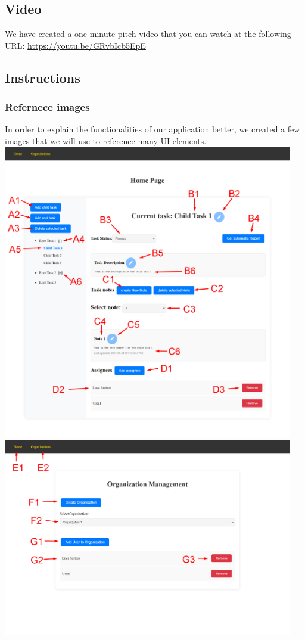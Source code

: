 \documentclass{article}
\begin{document}
\subsection{Video}
We have created a one minute pitch video that you can watch at the following URL: \url{https://youtu.be/GRvbIcb5EpE}

\subsection{Instructions}

\subsubsection{Refernece images}
In order to explain the functionalities of our application better, we created a few images that we will use to reference many UI elements.
\newline
\newline
\newline
\includegraphics[width=0.95\textwidth]{images/home_page.jpg}
\newline
\includegraphics[width=0.95\textwidth]{images/organizations_page.jpg}
\end{document}
